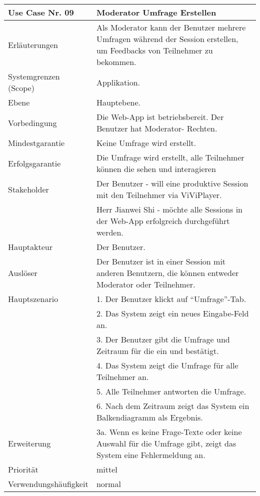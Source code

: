 \begin{tabularx}{\linewidth}{|l|X|}
	\hline
	Use Case Nr. 09			& \textbf{Moderator Umfrage Erstellen} \\ \hline
	Erläuterungen			& Als Moderator kann der Benutzer mehrere Umfragen während der Session 
							  erstellen, um Feedbacks von Teilnehmer zu bekommen. \\ \hline
	Systemgrenzen (Scope)	& Applikation. \\ \hline
	Ebene					& Hauptebene. \\ \hline
	Vorbedingung			& Die Web-App ist betriebsbereit. Der Benutzer hat Moderator-
							  Rechten. \\ \hline
	Mindestgarantie			& Keine Umfrage wird erstellt. \\ \hline
	Erfolgsgarantie			& Die Umfrage wird erstellt, alle Teilnehmer können die sehen und 
							  interagieren\\ \hline
	Stakeholder				& Der Benutzer - will eine produktive Session mit den Teilnehmer 
							  via ViViPlayer. \\
							& Herr Jianwei Shi - möchte alle Sessions in der Web-App 
							  erfolgreich durchgeführt werden. \\ \hline
	Hauptakteur				& Der Benutzer. \\ \hline
	Auslöser				& Der Benutzer ist in einer Session mit anderen Benutzern, die 
							  können entweder Moderator oder Teilnehmer. \\ \hline	
	Hauptszenario			& 1. Der Benutzer klickt auf ``Umfrage''-Tab. \\
							& 2. Das System zeigt ein neues Eingabe-Feld an. \\ 
							& 3. Der Benutzer gibt die Umfrage und Zeitraum für die ein und bestätigt. 
							  \\
							& 4. Das System zeigt die Umfrage für alle Teilnehmer an. \\ 
							& 5. Alle Teilnehmer antworten die Umfrage. \\
							& 6. Nach dem Zeitraum zeigt das System ein Balkendiagramm als Ergebnis. 
							  \\ \hline
	Erweiterung				& 3a. Wenn es keine Frage-Texte oder keine Auswahl für die Umfrage gibt,
							  zeigt das System eine Fehlermeldung an. \\ \hline
	Priorität				& mittel \\ \hline
	Verwendungshäufigkeit	& normal \\ \hline
\end{tabularx}